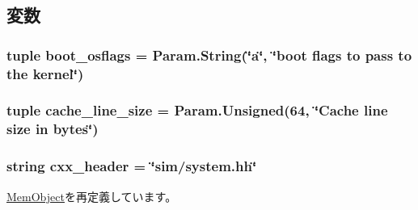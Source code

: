 \subsection{変数}
\hypertarget{classSystem_1_1System_ae7ab063871afdab88e46403466e3078c}{
\subsubsection[{boot\_\-osflags}]{\setlength{\rightskip}{0pt plus 5cm}tuple {\bf boot\_\-osflags} = Param.String(\char`\"{}a\char`\"{}, \char`\"{}boot flags to pass to the {\bf kernel}\char`\"{})}}
\label{classSystem_1_1System_ae7ab063871afdab88e46403466e3078c}
\hypertarget{classSystem_1_1System_a9ee7a697c8960b2b71fea23da5092cf9}{
\subsubsection[{cache\_\-line\_\-size}]{\setlength{\rightskip}{0pt plus 5cm}tuple {\bf cache\_\-line\_\-size} = Param.Unsigned(64, \char`\"{}Cache line size in bytes\char`\"{})}}
\label{classSystem_1_1System_a9ee7a697c8960b2b71fea23da5092cf9}
\hypertarget{classSystem_1_1System_a17da7064bc5c518791f0c891eff05fda}{
\subsubsection[{cxx\_\-header}]{\setlength{\rightskip}{0pt plus 5cm}string {\bf cxx\_\-header} = \char`\"{}sim/system.hh\char`\"{}}}
\label{classSystem_1_1System_a17da7064bc5c518791f0c891eff05fda}


\hyperlink{classMemObject_1_1MemObject_a17da7064bc5c518791f0c891eff05fda}{MemObject}を再定義しています。

